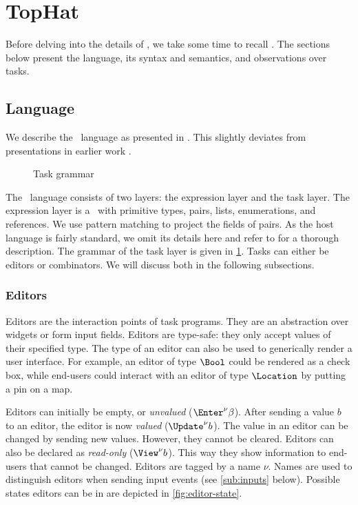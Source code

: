 
\section{TopHat}
\label{sec:tophat}

Before delving into the details of \DYNTOPHAT, we take some time to recall \TOPHAT.
The sections below present the language, its syntax and semantics, and observations over tasks.

\subsection{Language}

We describe the \TOPHAT\ language as presented in \citet{Steenvoorden22}.
This slightly deviates from presentations in earlier work \cite{conf/ppdp/SteenvoordenNK19,conf/ifl/NausSK19,conf/sfp/NausS20}.

\begin{figure}[b]
  \caption{Task grammar}
  \label{fig:task-grammar}
\end{figure}

The \TOPHAT\ language consists of two layers: the expression layer and the task layer.
The expression layer is a \STLC\ with primitive types, pairs, lists, enumerations, and references.
We use pattern matching to project the fields of pairs.
As the host language is fairly standard, we omit its details here
and refer to \citet{Steenvoorden22} for a thorough description.
The grammar of the task layer is given in \cref{fig:task-grammar}.
Tasks can either be editors or combinators.
We will discuss both in the following subsections.

\subsubsection{Editors}

Editors are the interaction points of task programs.
They are an abstraction over widgets or form input fields.
Editors are type-safe:
they only accept values of their specified type.
The type of an editor can also be used to generically render a user interface.
For example,
an editor of type $\Bool$ could be rendered as a check box,
while end-users could interact with an editor of type $\Location$ by putting a pin on a map.

Editors can initially be empty, or \emph{unvalued} ($\Enter^\nu \beta$).
After sending a value $b$ to an editor, the editor is now \emph{valued} ($\Update^\nu b$).
The value in an editor can be changed by sending new values.
However, they cannot be cleared.
Editors can also be declared as \emph{read-only} ($\View^\nu b$).
This way they show information to end-users that cannot be changed.
Editors are tagged by a name $\nu$.
Names are used to distinguish editors when sending input events (see \cref{sub:inputs} below).
Possible states editors can be in are depicted in \cref{fig:editor-state}.

